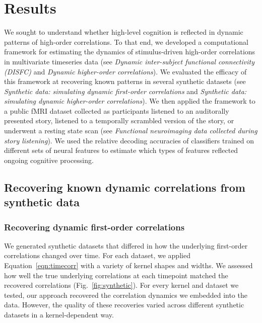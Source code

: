 \documentclass[english]{article}
\begin{document}
\section*{Results}
We sought to understand whether high-level cognition is reflected in
dynamic patterns of high-order correlations.  To that end, we
developed a computational framework for estimating the dynamics of
stimulus-driven high-order correlations in multivariate timeseries
data (see \textit{Dynamic inter-subject functional connectivity
  (DISFC)} and \textit{Dynamic higher-order correlations}).  We
evaluated the efficacy of this framework at recovering known patterns
in several synthetic datasets (see \textit{Synthetic data: simulating
  dynamic first-order correlations} and \textit{Synthetic data:
  simulating dynamic higher-order correlations}).  We then
applied the framework to a public fMRI dataset collected as
participants listened to an auditorally presented story, listened to a
temporally scrambled version of the story, or underwent a resting
state scan (see \textit{Functional neuroimaging data collected during
  story listening}).  We used the relative decoding accuracies of
classifiers trained on different sets of neural features to estimate
which types of features reflected ongoing cognitive processing.

\subsection*{Recovering known dynamic correlations from synthetic
  data}
\subsubsection*{Recovering dynamic first-order correlations}
We generated synthetic datasets that differed in how the underlying first-order
correlations changed over time.  For each dataset, we applied
Equation~\ref{eqn:timecorr} with a variety of kernel shapes and
widths.  We assessed how well the true underlying correlations at each
timepoint matched the recovered correlations
(Fig.~\ref{fig:synthetic}).  For every kernel and dataset we tested,
our approach recovered the correlation dynamics we embedded into the
data.  However, the quality of these recoveries varied across
different synthetic datasets in a kernel-dependent way.
\end{document}
